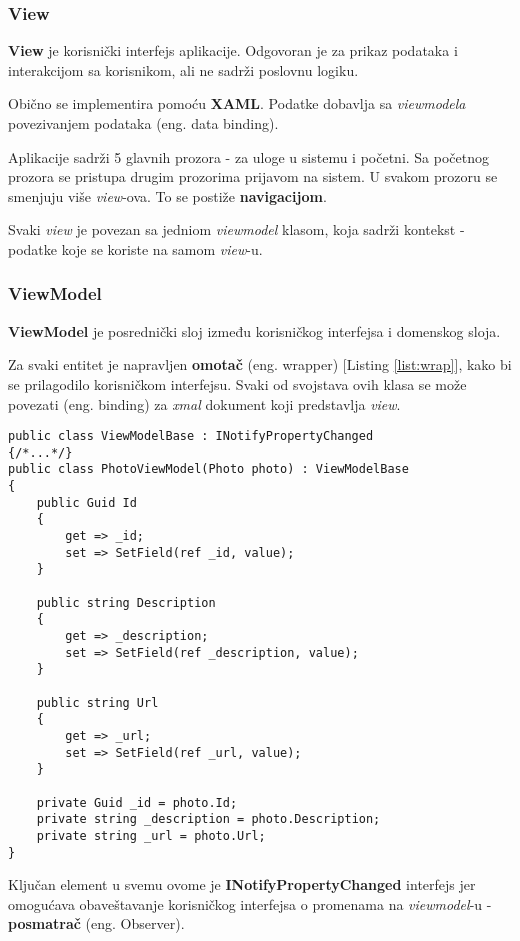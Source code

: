 \subsubsection*{View}
\par \textbf{View} je korisnički interfejs aplikacije. Odgovoran je za prikaz podataka i interakcijom sa korisnikom,
ali ne sadrži poslovnu logiku. 
\par Obično se implementira pomoću \textbf{XAML}. Podatke dobavlja sa \textit{viewmodela} povezivanjem podataka (eng. data binding).
\par Aplikacije sadrži 5 glavnih prozora - za uloge u sistemu i početni. Sa početnog prozora se pristupa drugim prozorima prijavom na sistem. U svakom prozoru se smenjuju više \textit{view}-ova.
To se postiže \textbf{navigacijom}. 
\par Svaki \textit{view} je povezan sa jedniom \textit{viewmodel} klasom, koja sadrži kontekst - podatke koje se koriste na samom \textit{view}-u.
\subsubsection*{ViewModel}
\par \textbf{ViewModel} je posrednički sloj između korisničkog interfejsa i domenskog sloja.
\par Za svaki entitet je napravljen \textbf{omotač} (eng. wrapper) [Listing \ref{list:wrap}], kako bi se prilagodilo korisničkom interfejsu. Svaki od svojstava ovih klasa se može povezati
(eng. binding) za \textit{xmal} dokument koji predstavlja \textit{view}. 
\begin{lstlisting}[caption={Primer ViewModel omotača}, captionpos=b, label=list:wrap]
public class ViewModelBase : INotifyPropertyChanged 
{/*...*/}
public class PhotoViewModel(Photo photo) : ViewModelBase
{
    public Guid Id
    {
        get => _id;
        set => SetField(ref _id, value);
    }

    public string Description
    {
        get => _description;
        set => SetField(ref _description, value);
    }

    public string Url
    {
        get => _url;
        set => SetField(ref _url, value);
    }

    private Guid _id = photo.Id;
    private string _description = photo.Description;
    private string _url = photo.Url;
}
\end{lstlisting}
\par Ključan element u svemu ovome je  \textbf{INotifyPropertyChanged} interfejs jer 
omogućava obaveštavanje korisničkog interfejsa o promenama na \textit{viewmodel}-u - \textbf{posmatrač} (eng. Observer).
